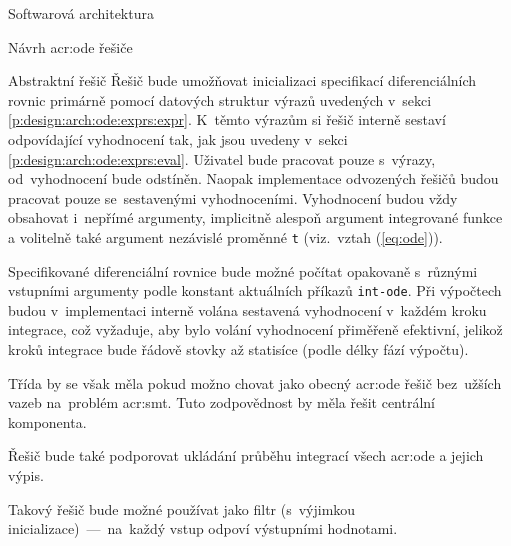 \documentclass[thesis=M,czech]{FITthesis}[2012/06/26]
\newcommand{\acrlabel}[1]{acr:#1}
\newcommand{\acr}[1]{\acrshort{\acrlabel{#1}}}
\newcommand{\id}[1]{\texttt{#1}}
\newcommand{\rf}[1]{\ref{#1}}
\newcommand{\rfeq}[1]{(\rf{eq:#1})}
\begin{document}
\begin{section}{Softwarová architektura}
\begin{subsection}{Návrh \acr{ode} řešiče}
\begin{subsubsection}{Abstraktní řešič}
Řešič bude umožňovat inicializaci
specifikací diferenciálních rovnic
primárně pomocí datových struktur výrazů uvedených
v~sekci \rf{p:design:arch:ode:exprs:expr}.
K~těmto výrazům si řešič interně sestaví odpovídající
vyhodnocení tak, jak jsou uvedeny
v~sekci \rf{p:design:arch:ode:exprs:eval}.
Uživatel bude pracovat pouze s~výrazy,
od~vyhodnocení bude odstíněn.
Naopak implementace odvozených řešičů
budou pracovat pouze se~sestavenými vyhodnoceními.
Vyhodnocení budou vždy obsahovat i~nepřímé argumenty,
implicitně alespoň argument integrované funkce
a volitelně také argument nezávislé proměnné \id{t}
(viz.~vztah \rfeq{ode}).

Specifikované diferenciální rovnice bude možné počítat opakovaně
s~různými vstupními argumenty podle konstant
aktuálních příkazů \id{int\--ode}.
Při výpočtech budou v~implementaci
interně volána sestavená vyhodnocení
v~každém kroku integrace,
což vyžaduje, aby bylo volání vyhodnocení
přiměřeně efektivní,
jelikož kroků integrace
bude řádově stovky až statisíce
(podle délky fází výpočtu).

Třída by se však měla pokud možno chovat
jako obecný \acr{ode} řešič
bez~užších vazeb na~problém \acr{smt}.
Tuto zodpovědnost by měla řešit centrální komponenta.

Řešič bude také podporovat ukládání průběhu
integrací všech \acr{ode} a jejich výpis.

Takový řešič bude možné používat jako filtr
(s~výjimkou inicializace)~---~na~každý vstup
odpoví výstupními hodnotami.
\end{subsubsection} %


\end{subsection} %



\end{section}
\end{document}

